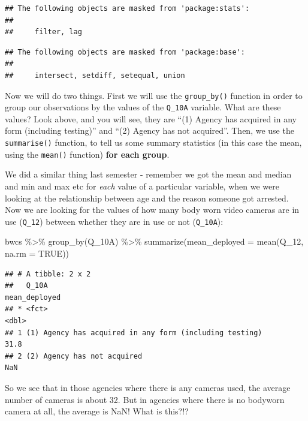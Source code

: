 \documentclass[
]{book}
\newenvironment{Shaded}{\begin{snugshade}}{\end{snugshade}}
\newcommand{\AttributeTok}[1]{\textcolor[rgb]{0.77,0.63,0.00}{#1}}
\newcommand{\ConstantTok}[1]{\textcolor[rgb]{0.00,0.00,0.00}{#1}}
\newcommand{\FunctionTok}[1]{\textcolor[rgb]{0.00,0.00,0.00}{#1}}
\newcommand{\NormalTok}[1]{#1}
\newcommand{\SpecialCharTok}[1]{\textcolor[rgb]{0.00,0.00,0.00}{#1}}
\begin{document}
\begin{verbatim}
## The following objects are masked from 'package:stats':
## 
##     filter, lag
\end{verbatim}

\begin{verbatim}
## The following objects are masked from 'package:base':
## 
##     intersect, setdiff, setequal, union
\end{verbatim}

Now we will do two things. First we will use the \texttt{group\_by()} function in order to group our observations by the values of the \texttt{Q\_10A} variable. What are these values? Look above, and you will see, they are ``(1) Agency has acquired in any form (including testing)'' and ``(2) Agency has not acquired''. Then, we use the \texttt{summarise()} function, to tell us some summary statistics (in this case the mean, using the \texttt{mean()} function) \textbf{for each group}.

We did a similar thing last semester - remember we got the mean and median and min and max etc for \emph{each} value of a particular variable, when we were looking at the relationship between age and the reason someone got arrested. Now we are looking for the values of how many body worn video cameras are in use (\texttt{Q\_12}) between whether they are in use or not (\texttt{Q\_10A}):

\begin{Shaded}
\begin{Highlighting}[]
\NormalTok{bwcs }\SpecialCharTok{\%\textgreater{}\%} 
  \FunctionTok{group\_by}\NormalTok{(Q\_10A) }\SpecialCharTok{\%\textgreater{}\%} 
  \FunctionTok{summarize}\NormalTok{(}\AttributeTok{mean\_deployed =} \FunctionTok{mean}\NormalTok{(Q\_12, }\AttributeTok{na.rm =} \ConstantTok{TRUE}\NormalTok{))}
\end{Highlighting}
\end{Shaded}

\begin{verbatim}
## # A tibble: 2 x 2
##   Q_10A                                                   mean_deployed
## * <fct>                                                           <dbl>
## 1 (1) Agency has acquired in any form (including testing)          31.8
## 2 (2) Agency has not acquired                                     NaN
\end{verbatim}

So we see that in those agencies where there is any cameras used, the average number of cameras is about 32.
But in agencies where there is no bodyworn camera at all, the average is NaN! What is this?!?
\end{document}
